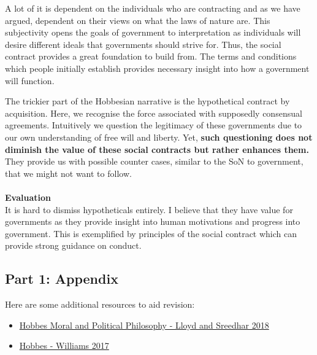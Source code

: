 \documentclass[12pt, letterpaper]{article}
\begin{document}
A lot of it is dependent on the individuals who are contracting and as we have argued, dependent on their views on what the laws of nature are. This subjectivity opens the goals of government to interpretation as individuals will desire different ideals that governments should strive for. Thus, the social contract provides a great foundation to build from. The terms and conditions which people initially establish provides necessary insight into how a government will function.

The trickier part of the Hobbesian narrative is the hypothetical contract by acquisition. Here, we recognise the force associated with supposedly consensual agreements. Intuitively we question the legitimacy of these governments due to our own understanding of free will and liberty. Yet, \textbf{such questioning does not diminish the value of these social contracts but rather enhances them.} They provide us with possible counter cases, similar to the SoN to government, that we might not want to follow.\\\\
\textbf{Evaluation}\\
It is hard to dismiss hypotheticals entirely. I believe that they have value for governments as they provide insight into human motivations and progress into government. This is exemplified by principles of the social contract which can provide strong guidance on conduct.

\subsection{Part 1: Appendix}
Here are some additional resources to aid revision:
\begin{itemize}
	\item \href{https://plato.stanford.edu/entries/hobbes-moral/}{Hobbes Moral and Political Philosophy - Lloyd and Sreedhar 2018}
	\item \href{https://www.iep.utm.edu/hobmoral/}{Hobbes - Williams 2017}
\end{itemize}
\end{document}
